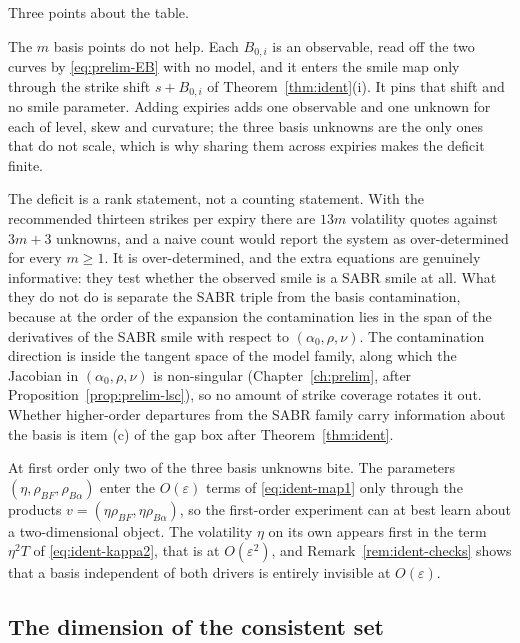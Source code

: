 \documentclass[../../../main.tex]{subfiles}
\begin{document}
Three points about the table.

The $m$ basis points do not help. Each $B_{0,i}$ is an observable, read off the two curves by \eqref{eq:prelim-EB} with no model, and it enters the smile map only through the strike shift $s+B_{0,i}$ of Theorem~\ref{thm:ident}(i). It pins that shift and no smile parameter. Adding expiries adds one observable and one unknown for each of level, skew and curvature; the three basis unknowns are the only ones that do not scale, which is why sharing them across expiries makes the deficit finite.

The deficit is a rank statement, not a counting statement. With the recommended thirteen strikes per expiry \citep[\S7.6, p.~25]{sarb2024conv} there are $13m$ volatility quotes against $3m+3$ unknowns, and a naive count would report the system as over-determined for every $m\ge1$. It is over-determined, and the extra equations are genuinely informative: they test whether the observed smile is a SABR smile at all. What they do not do is separate the SABR triple from the basis contamination, because at the order of the expansion the contamination lies in the span of the derivatives of the SABR smile with respect to $(\alpha_0,\rho,\nu)$. The contamination direction is inside the tangent space of the model family, along which the Jacobian in $(\alpha_0,\rho,\nu)$ is non-singular (Chapter~\ref{ch:prelim}, after Proposition~\ref{prop:prelim-lsc}), so no amount of strike coverage rotates it out. Whether higher-order departures from the SABR family carry information about the basis is item (c) of the gap box after Theorem~\ref{thm:ident}.

At first order only two of the three basis unknowns bite. The parameters $(\eta,\rho_{BF},\rho_{B\alpha})$ enter the $O(\varepsilon)$ terms of \eqref{eq:ident-map1} only through the products $v=(\eta\rho_{BF},\eta\rho_{B\alpha})$, so the first-order experiment can at best learn about a two-dimensional object. The volatility $\eta$ on its own appears first in the term $\eta^2T$ of \eqref{eq:ident-kappa2}, that is at $O(\varepsilon^2)$, and Remark~\ref{rem:ident-checks} shows that a basis independent of both drivers is entirely invisible at $O(\varepsilon)$.

\subsection{The dimension of the consistent set}
\end{document}
